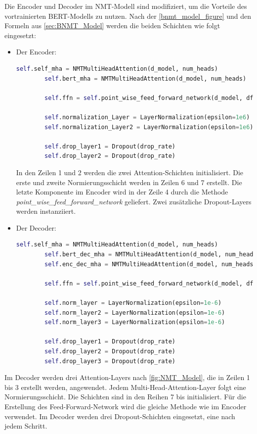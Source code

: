 Die Encoder und Decoder im NMT-Modell sind modifiziert, um die Vorteile des vortrainierten BERT-Modells zu nutzen. Nach der \cref{bnmt_model_figure} und den Formeln aus \cref{sec:BNMT_Model} werden die beiden Schichten wie folgt eingesetzt:

\begin{itemize}
	\item Der Encoder: 
	\begin{lstlisting}[language=Python, caption={BNMT\_Encoder}, label={BNMT_Encoder_init}]
		self.self_mha = NMTMultiHeadAttention(d_model, num_heads)
		self.bert_mha = NMTMultiHeadAttention(d_model, num_heads)
		
		self.ffn = self.point_wise_feed_forward_network(d_model, dff)
		
		self.normalization_Layer = LayerNormalization(epsilon=1e6)
		self.normalization_Layer2 = LayerNormalization(epsilon=1e6)	
		
		self.drop_layer1 = Dropout(drop_rate)
		self.drop_layer2 = Dropout(drop_rate)
	\end{lstlisting}
	In den Zeilen 1 und 2 werden die zwei Attention-Schichten initialisiert. Die erste und zweite Normierungsschicht werden in Zeilen 6 und 7 erstellt. Die letzte Komponente im Encoder wird in der Zeile 4 durch die Methode \\ \textit{point\_wise\_feed\_forward\_network} geliefert. Zwei zusätzliche Dropout-Layers werden instanziiert.
	\item Der Decoder:	
	\begin{lstlisting}[language=Python, caption={BNMT\_Decoder}, label={BNMT\_Decoder}]
		self.self_mha = NMTMultiHeadAttention(d_model, num_heads)
		self.bert_dec_mha = NMTMultiHeadAttention(d_model, num_heads)
		self.enc_dec_mha = NMTMultiHeadAttention(d_model, num_heads)
		
		self.ffn = self.point_wise_feed_forward_network(d_model, dff)
		
		self.norm_layer = LayerNormalization(epsilon=1e-6)
		self.norm_layer2 = LayerNormalization(epsilon=1e-6)
		self.norm_layer3 = LayerNormalization(epsilon=1e-6)
		
		self.drop_layer1 = Dropout(drop_rate)
		self.drop_layer2 = Dropout(drop_rate)
		self.drop_layer3 = Dropout(drop_rate)
	\end{lstlisting}
\end{itemize}
	Im Decoder werden drei Attention-Layers nach \cref{fig:NMT_Model}, die in Zeilen 1 bis 3 erstellt werden, angewendet. Jedem Multi-Head-Attention-Layer folgt eine Normierungsschicht. Die Schichten sind in den Reihen 7 bis initialisiert. Für die Erstellung des Feed-Forward-Network wird die gleiche Methode wie im Encoder verwendet. Im Decoder werden drei Dropout-Schichten eingesetzt, eine nach jedem Schritt.

